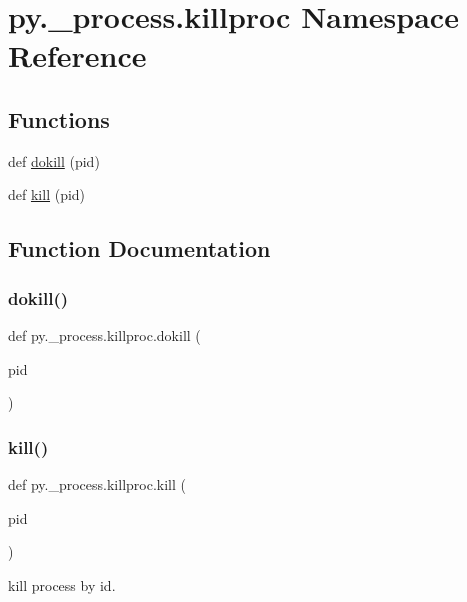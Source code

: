 \hypertarget{namespacepy_1_1__process_1_1killproc}{}\section{py.\+\_\+process.\+killproc Namespace Reference}
\label{namespacepy_1_1__process_1_1killproc}
\subsection*{Functions}
\begin{DoxyCompactItemize}
\item 
def \hyperlink{namespacepy_1_1__process_1_1killproc_a9cf09fec49c44269a7196dc8c3472762}{dokill} (pid)
\item 
def \hyperlink{namespacepy_1_1__process_1_1killproc_a34bb28829f7331b6f49307b283f35947}{kill} (pid)
\end{DoxyCompactItemize}


\subsection{Function Documentation}
\mbox{\label{namespacepy_1_1__process_1_1killproc_a9cf09fec49c44269a7196dc8c3472762}} 
\subsubsection{\texorpdfstring{dokill()}{dokill()}}
{\footnotesize\ttfamily def py.\+\_\+process.\+killproc.\+dokill (\begin{DoxyParamCaption}\item[{}]{pid }\end{DoxyParamCaption})}

\mbox{\label{namespacepy_1_1__process_1_1killproc_a34bb28829f7331b6f49307b283f35947}} 
\subsubsection{\texorpdfstring{kill()}{kill()}}
{\footnotesize\ttfamily def py.\+\_\+process.\+killproc.\+kill (\begin{DoxyParamCaption}\item[{}]{pid }\end{DoxyParamCaption})}

\begin{DoxyVerb}kill process by id. \end{DoxyVerb}
 